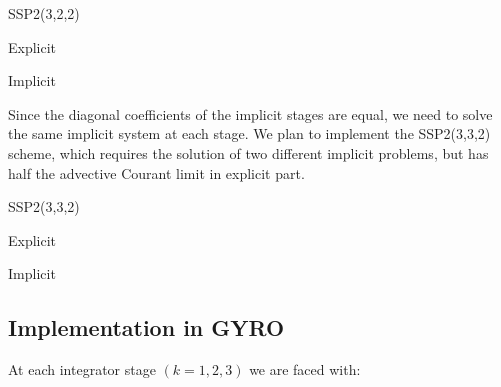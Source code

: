 \begin{center}
SSP2(3,2,2) 
\parbox{.3\linewidth}{
\mbox{Explicit} \par
{}}
\parbox{.3\linewidth}{
\mbox{Implicit} \par
{}}
\end{center}

Since the 
diagonal coefficients of the implicit stages are 
equal, we need to solve the same implicit system at 
each stage.  We plan to implement the SSP2(3,3,2)
scheme, which requires the solution of two 
different implicit problems, but has half the 
advective Courant limit in explicit part.

\begin{center}SSP2(3,3,2)
\parbox{.3\linewidth}{
\mbox{Explicit} \par
{}}
\parbox{.3\linewidth}{
\mbox{Implicit} \par
{}}
\end{center}

\subsection{Implementation in GYRO}

At each integrator stage $(k=1,2,3)$ we are faced with:

